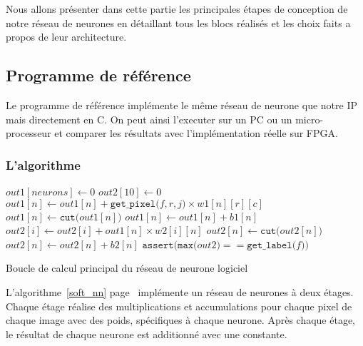 
Nous allons présenter dans cette partie les principales étapes de conception
de notre réseau de neurones en détaillant tous les blocs réalisés et les choix
faits a propos de leur architecture.

\subsection{Programme de référence}
Le programme de référence implémente le même réseau de neurone que notre IP
mais directement en C. On peut ainsi l'executer sur un PC ou un micro-processeur 
et comparer les résultats avec l'implémentation réelle sur FPGA.

\subsubsection{L'algorithme}

\begin{algorithm}
	\SetAlgoLined
	 {
		$out1[neurons] \leftarrow 0$\;
		$out2[10] \leftarrow 0$\;
		 {
			 {
				 {
					$out1[n] \leftarrow out1[n] + \texttt{get\_pixel(}f, r, j\texttt{)} \times w1[n][r][c]$\;
				}
			}
		}
		 {
			$out1[n] \leftarrow \texttt{cut(}out1[n]\texttt{)}$\;
			$out1[n] \leftarrow out1[n] + b1[n]$\;
		}
		 {
			 {
				$out2[i] \leftarrow out2[i] + out1[n] \times w2[i][n]$\;
			}
		}
		 {
			$out2[n] \leftarrow \texttt{cut(}out2[n]\texttt{)}$\;
			$out2[n] \leftarrow out2[n] + b2[n]$\;
		}
		$\texttt{assert(max(}out2\texttt{)} == \texttt{get\_label(}f\texttt{))}$\;
	}
	\caption{Boucle de calcul principal du réseau de neurone logiciel}
	\label{soft_nn}
\end{algorithm}

L'algorithme~\ref{soft_nn} page~\pageref{soft_nn} implémente un réseau de neurones à deux étages.
Chaque étage réalise des multiplications et accumulations pour chaque pixel de
chaque image avec des poids, spécifiques à chaque neurone. Après chaque étage, 
le résultat de chaque neurone est additionné avec une constante. 

